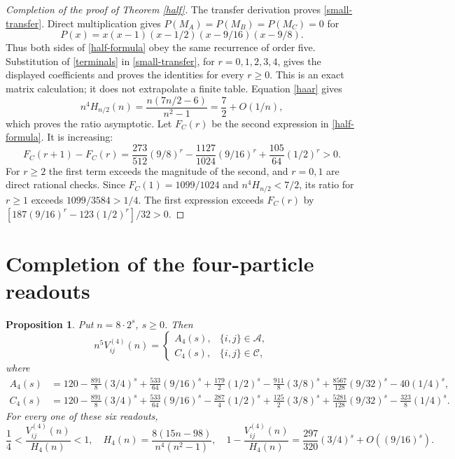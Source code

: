 \documentclass[11pt]{article}
\newtheorem{proposition}[theorem]{Proposition}
\begin{document}
\begin{proof}[Completion of the proof of Theorem \ref{half}]
The transfer derivation proves \eqref{small-transfer}. Direct multiplication gives
$P(M_A)=P(M_B)=P(M_C)=0$ for
\[
 P(x)=x(x-1)(x-1/2)(x-9/16)(x-9/8).
\]
Thus both sides of \eqref{half-formula} obey the same recurrence of order five.
Substitution of \eqref{terminals} in \eqref{small-transfer}, for $r=0,1,2,3,4$,
gives the displayed coefficients and proves the identities for every $r\geq0$.
This is an exact matrix calculation; it does not extrapolate a finite table.
Equation \eqref{haar} gives
\[
 n^4H_{n/2}(n)=\frac{n(7n/2-6)}{n^2-1}=\frac72+O(1/n),
\]
which proves the ratio asymptotic.
Let $F_C(r)$ be the second expression in \eqref{half-formula}. It is increasing:
\[
 F_C(r+1)-F_C(r)=\frac{273}{512}(9/8)^r
       -\frac{1127}{1024}(9/16)^r+\frac{105}{64}(1/2)^r>0.
\]
For $r\geq2$ the first term exceeds the magnitude of the second, and $r=0,1$
are direct rational checks. Since $F_C(1)=1099/1024$ and $n^4H_{n/2}<7/2$,
its ratio for $r\geq1$ exceeds $1099/3584>1/4$.
The first expression exceeds $F_C(r)$ by
$[187(9/16)^r-123(1/2)^r]/32>0$.
\end{proof}

\section{Completion of the four-particle readouts}
\begin{proposition}\label{four}
Put $n=8\cdot2^s$, $s\geq0$. Then
\[
 n^5V^{(4)}_{ij}(n)=\begin{cases}A_4(s),&\{i,j\}\in\mathcal A,\\
 C_4(s),&\{i,j\}\in\mathcal C,\end{cases}
\]
where
\begin{align*}
 A_4(s)&=120-\tfrac{891}{8}(3/4)^s+\tfrac{533}{64}(9/16)^s
       +\tfrac{179}{2}(1/2)^s-\tfrac{911}{8}(3/8)^s
       +\tfrac{8567}{128}(9/32)^s-40(1/4)^s,\\
 C_4(s)&=120-\tfrac{891}{8}(3/4)^s+\tfrac{533}{64}(9/16)^s
       -\tfrac{287}{4}(1/2)^s+\tfrac{125}{2}(3/8)^s
       +\tfrac{5281}{128}(9/32)^s-\tfrac{323}{8}(1/4)^s.
\end{align*}
For every one of these six readouts,
\[
 \frac14<\frac{V^{(4)}_{ij}(n)}{H_4(n)}<1,\quad
 H_4(n)=\frac{8(15n-98)}{n^4(n^2-1)},\quad
 1-\frac{V^{(4)}_{ij}(n)}{H_4(n)}
 =\frac{297}{320}(3/4)^s+O((9/16)^s).
\]
\end{proposition}
\end{document}
